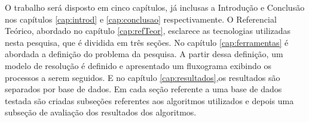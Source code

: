  



O trabalho será disposto em cinco capítulos, já inclusas a Introdução e Conclusão nos capítulos \ref{cap:introd} e \ref{cap:conclusao} respectivamente. O Referencial Teórico, abordado no capítulo \ref{cap:refTeor}, esclarece as tecnologias utilizadas nesta pesquisa, que é dividida em três seções. No capítulo \ref{cap:ferramentas} é abordada a definição do problema da pesquisa. A partir dessa definição, um modelo de resolução é definido e apresentado um fluxograma exibindo os processos a serem seguidos. E  no capítulo \ref{cap:resultados},os resultados são separados por base de dados. Em cada seção referente a uma base de dados testada são criadas subseções referentes aos algoritmos utilizados  e depois uma subseção de avaliação dos resultados dos algoritmos.


